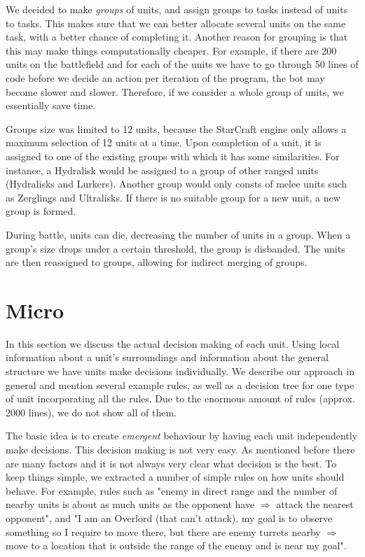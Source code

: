 We decided to make \emph{groups} of units, and assign groups to tasks instead of units to tasks. This makes sure that we can better allocate several units on the same task, with a better chance of completing it. Another reason for grouping is that this may make things computationally cheaper. For example, if there are 200 units on the battlefield and for each of the units we have to go through 50 lines of code before we decide an action per iteration of the program, the bot may become slower and slower. Therefore, if we consider a whole group of units, we essentially save time. 

Groups size was limited to 12 units, because the StarCraft engine only allows a maximum selection of 12 units at a time. Upon completion of a unit, it is assigned to one of the existing groups with which it has some similarities. For instance, a Hydralisk would be assigned to a group of other ranged units (Hydralisks and Lurkers). Another group would only consts of melee units such as Zerglings and Ultralisks. If there is no suitable group for a new unit, a new group is formed.

During battle, units can die, decreasing the number of units in a group. When a group's size drops under a certain threshold, the group is disbanded. The units are then reassigned to groups, allowing for indirect merging of groups.

\section{Micro}
\label{strategy:micro}
In this section we discuss the actual decision making of each unit. Using local information about a unit's surroundings and information about the general structure we have units make decisions individually. We describe our approach in general and mention several example rules, as well as a decision tree for one type of unit incorporating all the rules. Due to the enormous amount of rules (approx. 2000 lines), we do not show all of them.

The basic idea is to create \emph{emergent} behaviour by having each unit independently make decisions. This decision making is not very easy. As mentioned before there are many factors and it is not always very clear what decision is the best. To keep things simple, we extracted a number of simple rules on how units should behave. For example, rules such as "enemy in direct range and the number of nearby units is about as much units as the opponent have $\Rightarrow$ attack the nearest opponent", and "I am an Overlord (that can't attack), my goal is to observe something so I require to move there, but there are enemy turrets nearby $\Rightarrow$ move to a location that is outside the range of the enemy and is near my goal".


